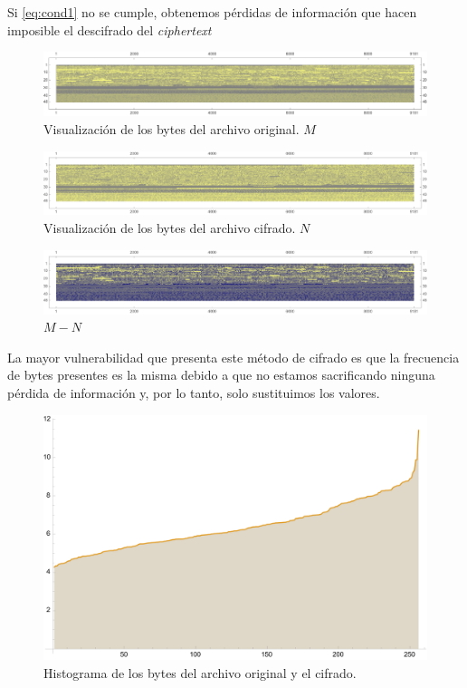 \documentclass[a4paper]{article}
\begin{document}
Si \eqref{eq:cond1} no se cumple, obtenemos pérdidas de información que hacen
imposible el descifrado del \textit{ciphertext}

\begin{figure}[H]
    \centering
    \includegraphics[width=\textwidth]{gr3d}
    \caption{Visualización de los bytes del archivo
original. $M$}
    \label{fig:DatosOrigM1}
\end{figure}

\begin{figure}[H]
    \centering
    \includegraphics[width=\textwidth]{bytes2}
    \caption{Visualización de los bytes del archivo
cifrado. $N$}
    \label{fig:DatosOrigM2}
\end{figure}

\begin{figure}[H]
    \centering
    \includegraphics[width=\textwidth]{bytes3}
    \caption{$M-N$}
    \label{fig:DatosOrigM3}
\end{figure}

La mayor vulnerabilidad que presenta este método de cifrado es que la
frecuencia de bytes presentes es la misma debido a que no estamos
sacrificando ninguna pérdida de información y, por lo tanto, solo sustituimos los
valores.

\begin{figure}[H]
    \centering
    \includegraphics[width=\textwidth]{historygram.png}
    \caption{Histograma de los bytes del archivo
original y el cifrado.}
    \label{fig:Histo1}
\end{figure}
\end{document}
